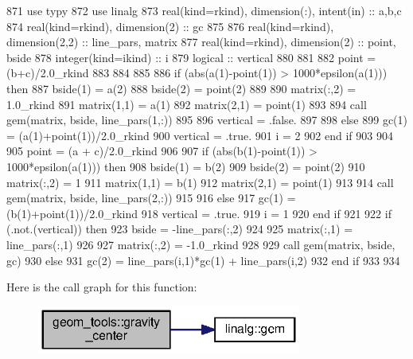 \begin{DoxyCode}
871     \textcolor{keywordtype}{use }typy
872     \textcolor{keywordtype}{use }linalg
873     \textcolor{keywordtype}{real(kind=rkind)}, \textcolor{keywordtype}{dimension(:)}, \textcolor{keywordtype}{intent(in)} :: a,b,c
874     \textcolor{keywordtype}{real(kind=rkind)}, \textcolor{keywordtype}{dimension(2)} :: gc
875 
876     \textcolor{keywordtype}{real(kind=rkind)}, \textcolor{keywordtype}{dimension(2,2)} :: line\_pars, matrix
877     \textcolor{keywordtype}{real(kind=rkind)}, \textcolor{keywordtype}{dimension(2)} :: point, bside
878     \textcolor{keywordtype}{integer(kind=ikind)} :: i
879     \textcolor{keywordtype}{logical} :: vertical
880 
881     
882     point = (b+c)/2.0\_rkind
883     
884 
885 
886     \textcolor{keywordflow}{if} (abs(a(1)-point(1)) > 1000*epsilon(a(1))) \textcolor{keywordflow}{then}
887       bside(1) = a(2)
888       bside(2) = point(2)
889 
890       matrix(:,2) = 1.0\_rkind
891       matrix(1,1) = a(1)
892       matrix(2,1) = point(1)
893 
894       \textcolor{keyword}{call }gem(matrix, bside, line\_pars(1,:))
895 
896       vertical = .false.
897 
898     \textcolor{keywordflow}{else}
899       gc(1) = (a(1)+point(1))/2.0\_rkind
900       vertical = .true.
901       i = 2
902 \textcolor{keywordflow}{    end if}
903       
904     
905     point = (a + c)/2.0\_rkind
906    
907     \textcolor{keywordflow}{if} (abs(b(1)-point(1)) > 1000*epsilon(a(1))) \textcolor{keywordflow}{then}
908       bside(1) = b(2)
909       bside(2) = point(2)
910       matrix(:,2) = 1
911       matrix(1,1) = b(1)
912       matrix(2,1) = point(1)
913     
914       \textcolor{keyword}{call }gem(matrix, bside, line\_pars(2,:))
915 
916     \textcolor{keywordflow}{else}
917       gc(1) = (b(1)+point(1))/2.0\_rkind
918       vertical = .true.
919       i = 1
920 \textcolor{keywordflow}{    end if}
921       
922     \textcolor{keywordflow}{if} (.not.(vertical)) \textcolor{keywordflow}{then}
923       bside = -line\_pars(:,2)
924 
925       matrix(:,1) = line\_pars(:,1)
926 
927       matrix(:,2) = -1.0\_rkind
928 
929       \textcolor{keyword}{call }gem(matrix, bside, gc)
930     \textcolor{keywordflow}{else}
931       gc(2) = line\_pars(i,1)*gc(1) + line\_pars(i,2)
932 \textcolor{keywordflow}{    end if}
933     
934 
\end{DoxyCode}


Here is the call graph for this function\+:\nopagebreak
\begin{figure}[H]
\begin{center}
\leavevmode
\includegraphics[width=246pt]{namespacegeom__tools_ac5eea8089dba9b61e9512793819eca93_cgraph}
\end{center}
\end{figure}




